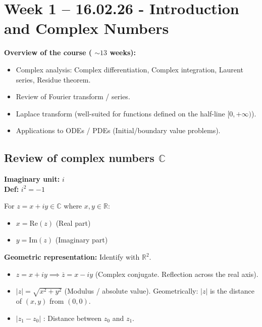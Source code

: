 \section{Week 1 -- 16.02.26 - Introduction and Complex Numbers}

\textbf{Overview of the course ( $\sim 13$ weeks):}
\begin{itemize}
    \item Complex analysis: Complex differentiation, Complex integration, Laurent series, Residue theorem.
    \item Review of Fourier transform / series.
    \item Laplace transform (well-suited for functions defined on the half-line $[0,+\infty)$).
    \item Applications to ODEs / PDEs (Initial/boundary value problems).
\end{itemize}

\subsection{Review of complex numbers $\mathbb{C}$}

\begin{definition}
\textbf{Imaginary unit:} $i$ \\
\textbf{Def:} $i^{2} = -1$

For $z = x + iy \in \mathbb{C}$ where $x,y \in \mathbb{R}$:
\begin{itemize}
    \item $x = \text{Re}(z)$ (Real part)
    \item $y = \text{Im}(z)$ (Imaginary part)
\end{itemize}
\end{definition}

\textbf{Geometric representation:} Identify with $\mathbb{R}^{2}$.
\begin{itemize}
    \item $z = x + iy \implies \overline{z} = x - iy$ (Complex conjugate. Reflection across the real axis).
    \item $|z| = \sqrt{x^{2} + y^{2}}$ (Modulus / absolute value). Geometrically: $|z|$ is the distance of $(x,y)$ from $(0,0)$.
    \item $|z_{1} - z_{0}|$ : Distance between $z_{0}$ and $z_{1}$.
\end{itemize}

